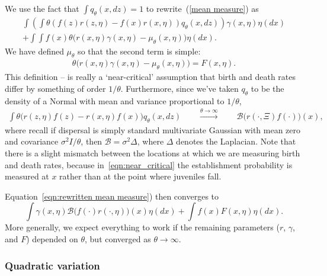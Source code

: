 \documentclass[12pt]{article}
\newcommand{\DG}{\mathcal{B}}  %
\begin{document}
We use the fact that $\int q_\theta(x,dz)=1$ to rewrite~(\ref{mean measure})
as 
\begin{equation}
\label{eqn:rewritten mean measure}
\begin{split}
    \int\left(
        \int \theta \left( f(z) r(z,\eta)- f(x) r(x,\eta) \right) q_\theta(x,dz)
    \right)
    \gamma(x,\eta)
    \eta(dx)
    \\
    + \int \int f(x) \theta \Big(
        r(x,\eta) \gamma(x,\eta)
        - \mu_\theta(x,\eta)
    \Big) \eta(dx).
\end{split}
\end{equation}
We have defined $\mu_\theta$ so that the second term is simple:
\begin{align*}
    \theta \Big( r(x,\eta) \gamma(x,\eta) - \mu_\theta(x,\eta) \Big)
    = F(x, \eta) .
\end{align*}
This definition --
is really a `near-critical' assumption that birth and death rates
differ by something of order $1/\theta$.
Furthermore, since we've taken $q_\theta$ to be the density of a Normal
with mean and variance proportional to $1/\theta$,
\begin{align} \label{eqn:near_critical}
    \int \theta \Big(
        r(z,\eta) f(z)
        -
        r(x,\eta) f(x)
    \Big) q_\theta(x,dz) 
    \qquad \stackrel{\theta\to\infty}{\longrightarrow} \qquad  
    \DG \big(r(\cdot,\Xi)f(\cdot)\big)(x),
\end{align}
where recall if dispersal is simply standard multivariate Gaussian
with mean zero and covariance $\sigma^2 I / \theta$,
then $\DG = \sigma^2 \Delta$, where $\Delta$ denotes the Laplacian.
Note that there is a slight mismatch between the locations at which we are 
measuring birth and death rates, because in~\eqref{eqn:near_critical}
the establishment probability is 
measured at $x$ rather than at the point where juveniles fall. 

Equation~\eqref{eqn:rewritten mean measure}) then converges to
\begin{equation} \label{limit of mean measure equation}
\int \gamma(x,\eta)
\DG \big(f(\cdot)r(\cdot,\eta)\big)(x)
\eta(dx)
+
\int f(x)
F(x,\eta)
\eta(dx) .
\end{equation}
More generally, we expect everything to work
if the remaining parameters ($r$, $\gamma$, and $F$)
depended on $\theta$, but converged as $\theta \to \infty$.


\subsubsection*{Quadratic variation}
\end{document}
